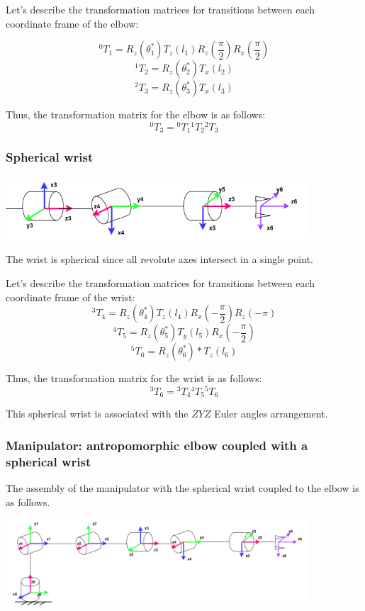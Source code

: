 \documentclass{article}
\begin{document}
Let's describe the transformation matrices for transitions between each coordinate frame of  the elbow:

\[{}^0T_1 = R_z(\theta_1^*) T_z(l_1) R_z(\frac{\pi}{2}) R_x(\frac{\pi}{2})\]
\[{}^1T_2 = R_z(\theta_2^*) T_x(l_2) \]
\[{}^2T_3 = R_z(\theta_3^*) T_x(l_3) \]


Thus, the transformation matrix for the elbow is as follows:
\[{}^0T_3 = {}^0T_1 {}^1T_2 {}^2T_3 \]



\subsubsection{Spherical wrist}

\begin{center}
    \includegraphics*[width=0.85\textwidth]{images/new_spherical_wrist.png}
\end{center}

The wrist is spherical since all revolute axes intersect in a single point. 

Let's describe the transformation matrices for transitions between each coordinate frame of  the wrist:
\[{}^3T_4 = R_z(\theta_4^*) T_z(l_4) R_x(-\dfrac{\pi}{2}) R_z(-\pi)\]
\[{}^4T_5 = R_z(\theta_5^*) T_y(l_5) R_x(-\dfrac{\pi}{2})\]
\[{}^5T_6 = R_z(\theta_6^*)*T_z(l_6)\]

Thus, the transformation matrix for the wrist is as follows:
\[{}^3T_6 = {}^3T_4 {}^4T_5 {}^5T_6 \]

This spherical wrist is associated with the $ZYZ$ Euler angles arrangement.


\subsubsection{Manipulator: antropomorphic elbow coupled with a spherical wrist}

The assembly of the manipulator with the spherical wrist coupled to the elbow is as follows.

\begin{center}
    \includegraphics*[width=0.85\textwidth]{images/new_manipulator.png}
\end{center}
\end{document}
